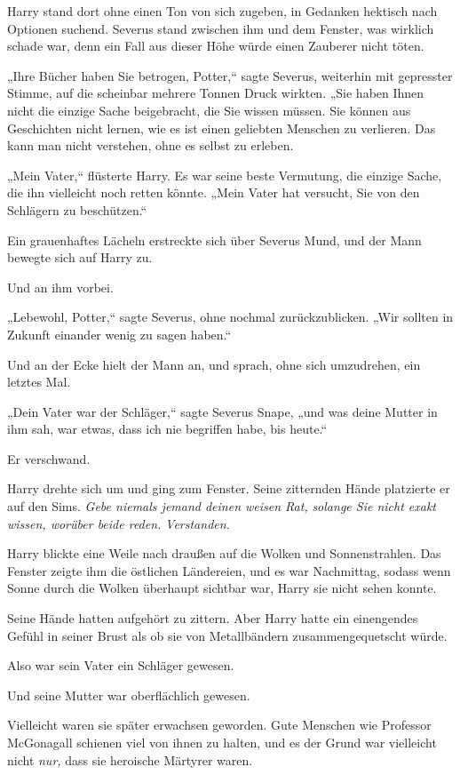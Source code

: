 {Harry stand dort ohne einen Ton von sich zugeben, in Gedanken hektisch nach Optionen suchend. Severus stand zwischen ihm und dem Fenster, was wirklich schade war, denn ein Fall aus dieser Höhe würde einen Zauberer nicht töten.

„Ihre Bücher haben Sie betrogen, Potter,“ sagte Severus, weiterhin mit gepresster Stimme, auf die scheinbar mehrere Tonnen Druck wirkten. „Sie haben Ihnen nicht die einzige Sache beigebracht, die Sie wissen müssen. Sie können aus Geschichten nicht lernen, wie es ist einen geliebten Menschen zu verlieren. Das kann man nicht verstehen, ohne es selbst zu erleben.

„Mein Vater,“ flüsterte Harry. Es war seine beste Vermutung, die einzige Sache, die ihn vielleicht noch retten könnte. „Mein Vater hat versucht, Sie von den Schlägern zu beschützen.“

Ein grauenhaftes Lächeln erstreckte sich über Severus Mund, und der Mann bewegte sich auf Harry zu.

Und an ihm vorbei.

„Lebewohl, Potter,“ sagte Severus, ohne nochmal zurückzublicken. „Wir sollten in Zukunft einander wenig zu sagen haben.“

Und an der Ecke hielt der Mann an, und sprach, ohne sich umzudrehen, ein letztes Mal.

„Dein Vater war der Schläger,“ sagte Severus Snape, „und was deine Mutter in ihm sah, war etwas, dass ich nie begriffen habe, bis heute.“

Er verschwand.

Harry drehte sich um und ging zum Fenster. Seine zitternden Hände platzierte er auf den Sims. \emph{Gebe niemals jemand deinen weisen Rat,} \emph{solange Sie nicht exakt wissen, worüber beide reden.} \emph{Verstanden.}

Harry blickte eine Weile nach draußen auf die Wolken und Sonnenstrahlen. Das Fenster zeigte ihm die östlichen Ländereien, und es war Nachmittag, sodass wenn Sonne durch die Wolken überhaupt sichtbar war, Harry sie nicht sehen konnte.

Seine Hände hatten aufgehört zu zittern. Aber Harry hatte ein einengendes Gefühl in seiner Brust als ob sie von Metallbändern zusammengequetscht würde.

Also war sein Vater ein Schläger gewesen.

Und seine Mutter war oberflächlich gewesen.

Vielleicht waren sie später erwachsen geworden. Gute Menschen wie Professor McGonagall schienen viel von ihnen zu halten, und es der Grund war vielleicht nicht \emph{nur,} dass sie heroische Märtyrer waren.

}
